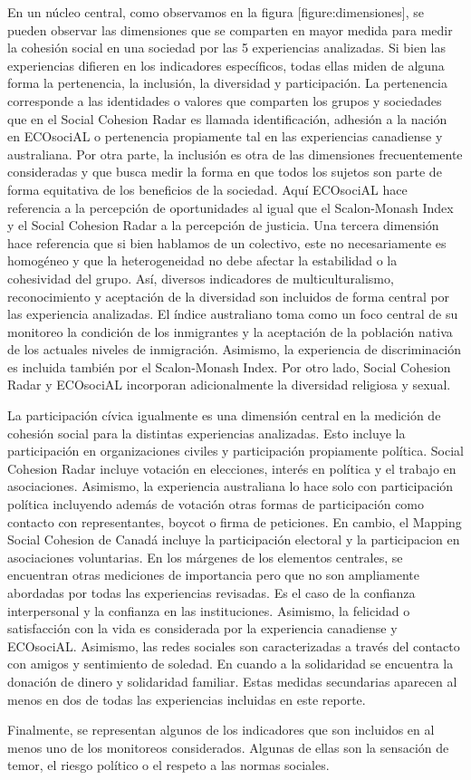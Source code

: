 \documentclass[
  12pt,
]{book}
\begin{document}
En un núcleo central, como observamos en la figura {[}figure:dimensiones{]},
se pueden observar las dimensiones que se comparten en mayor medida para
medir la cohesión social en una sociedad por las 5 experiencias
analizadas. Si bien las experiencias difieren en los indicadores
específicos, todas ellas miden de alguna forma la pertenencia, la
inclusión, la diversidad y participación. La pertenencia corresponde a
las identidades o valores que comparten los grupos y sociedades que en
el Social Cohesion Radar es llamada identificación, adhesión a la nación
en ECOsociAL o pertenencia propiamente tal en las experiencias
canadiense y australiana. Por otra parte, la inclusión es otra de las
dimensiones frecuentemente consideradas y que busca medir la forma en
que todos los sujetos son parte de forma equitativa de los beneficios de
la sociedad. Aquí ECOsociAL hace referencia a la percepción de
oportunidades al igual que el Scalon-Monash Index y el Social Cohesion
Radar a la percepción de justicia. Una tercera dimensión hace referencia
que si bien hablamos de un colectivo, este no necesariamente es
homogéneo y que la heterogeneidad no debe afectar la estabilidad o la
cohesividad del grupo. Así, diversos indicadores de multiculturalismo,
reconocimiento y aceptación de la diversidad son incluidos de forma
central por las experiencia analizadas. El índice australiano toma como
un foco central de su monitoreo la condición de los inmigrantes y la
aceptación de la población nativa de los actuales niveles de
inmigración. Asimismo, la experiencia de discriminación es incluida
también por el Scalon-Monash Index. Por otro lado, Social Cohesion Radar
y ECOsociAL incorporan adicionalmente la diversidad religiosa y sexual.

La participación cívica igualmente es una dimensión central en la
medición de cohesión social para la distintas experiencias analizadas.
Esto incluye la participación en organizaciones civiles y participación
propiamente política. Social Cohesion Radar incluye votación en
elecciones, interés en política y el trabajo en asociaciones. Asimismo,
la experiencia australiana lo hace solo con participación política
incluyendo además de votación otras formas de participación como
contacto con representantes, boycot o firma de peticiones. En cambio, el
Mapping Social Cohesion de Canadá incluye la participación electoral y
la participacion en asociaciones voluntarias. En los márgenes de los
elementos centrales, se encuentran otras mediciones de importancia pero
que no son ampliamente abordadas por todas las experiencias revisadas.
Es el caso de la confianza interpersonal y la confianza en las
instituciones. Asimismo, la felicidad o satisfacción con la vida es
considerada por la experiencia canadiense y ECOsociAL. Asimismo, las
redes sociales son caracterizadas a través del contacto con amigos y
sentimiento de soledad. En cuando a la solidaridad se encuentra la
donación de dinero y solidaridad familiar. Estas medidas secundarias
aparecen al menos en dos de todas las experiencias incluidas en este
reporte.

Finalmente, se representan algunos de los indicadores que son incluidos
en al menos uno de los monitoreos considerados. Algunas de ellas son la
sensación de temor, el riesgo político o el respeto a las normas
sociales.

  
\end{document}
